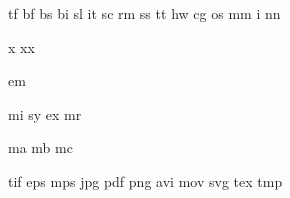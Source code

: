  {tf}
 {bf}
 {bs}
 {bi}
 {sl}
 {it}
 {sc}
 {rm}
 {ss}
 {tt}
 {hw}
 {cg}
 {os}
 {mm}
  {i}
 {nn}

  {x}
 {xx}

 {em}

 {mi}
 {sy}
 {ex}
 {mr}

 {ma}
 {mb}
 {mc}


  {tif}
  {eps}
  {mps}
  {jpg}
  {pdf}
  {png}
  {avi}
  {mov}
  {svg}
  {tex}
  {tmp}


\selectinterface



\protect

\endinput
